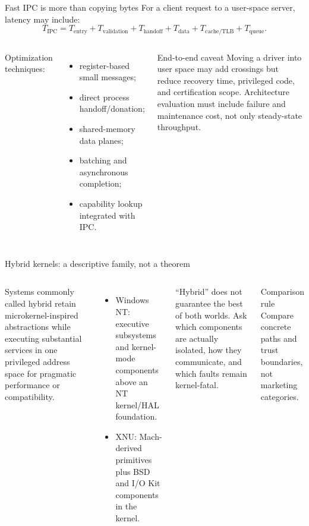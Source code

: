 \documentclass[aspectratio=169,11pt]{beamer}
\begin{document}
\begin{frame}{Fast IPC is more than copying bytes}
  For a client request to a user-space server, latency may include:
  \[
    T_{\text{IPC}} = T_{\text{entry}} + T_{\text{validation}} + T_{\text{handoff}}
      + T_{\text{data}} + T_{\text{cache/TLB}} + T_{\text{queue}}.
  \]
  \begin{columns}[T,onlytextwidth]
      Optimization techniques:
      \begin{itemize}
        \item register-based small messages;
        \item direct process handoff/donation;
        \item shared-memory data planes;
        \item batching and asynchronous completion;
        \item capability lookup integrated with IPC.
      \end{itemize}
      \begin{alertblock}{End-to-end caveat}
        Moving a driver into user space may add crossings but reduce recovery time, privileged code, and certification scope. Architecture evaluation must include failure and maintenance cost, not only steady-state throughput.
      \end{alertblock}
  \end{columns}
\end{frame}

\begin{frame}{Hybrid kernels: a descriptive family, not a theorem}
  \begin{columns}[T,onlytextwidth]
      Systems commonly called hybrid retain microkernel-inspired abstractions while executing substantial services in one privileged address space for pragmatic performance or compatibility.
      \begin{itemize}
        \item Windows NT: executive subsystems and kernel-mode components above an NT kernel/HAL foundation.
        \item XNU: Mach-derived primitives plus BSD and I/O Kit components in the kernel.
      \end{itemize}
      \begin{tcolorbox}[title=Do not overread the label]
        ``Hybrid'' does not guarantee the best of both worlds. Ask which components are actually isolated, how they communicate, and which faults remain kernel-fatal.
      \end{tcolorbox}
      \begin{block}{Comparison rule}
        Compare concrete paths and trust boundaries, not marketing categories.
      \end{block}
  \end{columns}
\end{frame}
\end{document}
